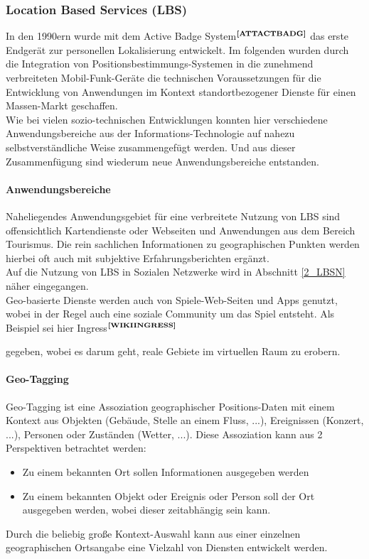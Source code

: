 \subsubsection{Location Based Services (LBS)}
In den 1990ern wurde mit dem Active Badge System$^{\textbf{\ref{ATTACTBADG}}}$ das erste Endgerät zur personellen Lokalisierung entwickelt.
Im folgenden wurden durch die Integration von Positionsbestimmungs-Systemen in die zunehmend verbreiteten Mobil-Funk-Geräte die technischen Voraussetzungen für die Entwicklung von Anwendungen im Kontext standortbezogener Dienste für einen Massen-Markt geschaffen.\\
Wie bei vielen sozio-technischen Entwicklungen konnten hier verschiedene Anwendungsbereiche aus der Informations-Technologie auf nahezu selbstverständliche Weise zusammengefügt werden. Und aus dieser Zusammenfügung sind wiederum neue Anwendungsbereiche entstanden.

\paragraph{Anwendungsbereiche}\label{sec:GL:GEOTAG}
Naheliegendes Anwendungsgebiet für eine verbreitete Nutzung von LBS sind offensichtlich Kartendienste oder Webseiten und Anwendungen aus dem Bereich Tourismus. Die rein sachlichen Informationen zu geographischen Punkten werden hierbei oft auch mit subjektive Erfahrungsberichten ergänzt.\\
Auf die Nutzung von LBS in Sozialen Netzwerke wird in Abschnitt \ref{2_LBSN} näher eingegangen.\\
Geo-basierte Dienste werden auch von Spiele-Web-Seiten und Apps genutzt, wobei in der Regel auch eine soziale Community um das Spiel entsteht. Als Beispiel sei hier Ingress$^{\textbf{\ref{WIKIINGRESS}}}$%
\addtocounter{footnote}{1}%
gegeben, wobei es darum geht, reale Gebiete im virtuellen Raum zu erobern.

\paragraph{Geo-Tagging}\label{sec:GL:GEOTAG}
Geo-Tagging ist eine Assoziation geographischer Positions-Daten mit einem Kontext aus Objekten (Gebäude, Stelle an einem Fluss, ...), Ereignissen (Konzert, ...), Personen oder Zuständen (Wetter, ...). Diese Assoziation kann aus 2 Perspektiven betrachtet werden:
\begin{itemize}[leftmargin=*,noitemsep,topsep=1ex,parsep=0pt,partopsep=0pt]
\item Zu einem bekannten Ort sollen Informationen ausgegeben werden
\item Zu einem bekannten Objekt oder Ereignis oder Person soll der Ort ausgegeben werden, wobei dieser zeitabhängig sein kann.
\end{itemize}
Durch die beliebig große Kontext-Auswahl kann aus einer einzelnen geographischen Ortsangabe eine Vielzahl von Diensten entwickelt werden.


